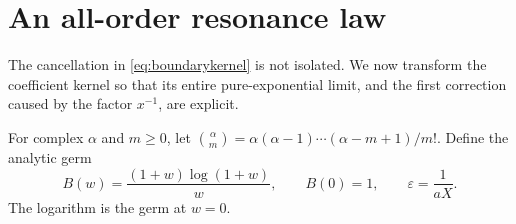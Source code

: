 \documentclass[11pt,a4paper]{article}
\numberwithin{equation}{section}
\theoremstyle{definition}
\theoremstyle{remark}
\newcommand{\eps}{\varepsilon}
\begin{document}
\section{An all-order resonance law}\label{sec:resonance}

The cancellation in \eqref{eq:boundarykernel} is not isolated. We now
transform the coefficient kernel so that its entire pure-exponential
limit, and the first correction caused by the factor $x^{-1}$, are
explicit.

For complex $\alpha$ and $m\ge0$, let
$\binom{\alpha}{m}=\alpha(\alpha-1)\cdots(\alpha-m+1)/m!$.
Define the analytic germ
\begin{equation}
 B(w)=\frac{(1+w)\log(1+w)}w,
 \qquad B(0)=1,
 \qquad \eps=\frac1{aX}.
 \label{eq:Bkernel}
\end{equation}
The logarithm is the germ at $w=0$.
\end{document}

